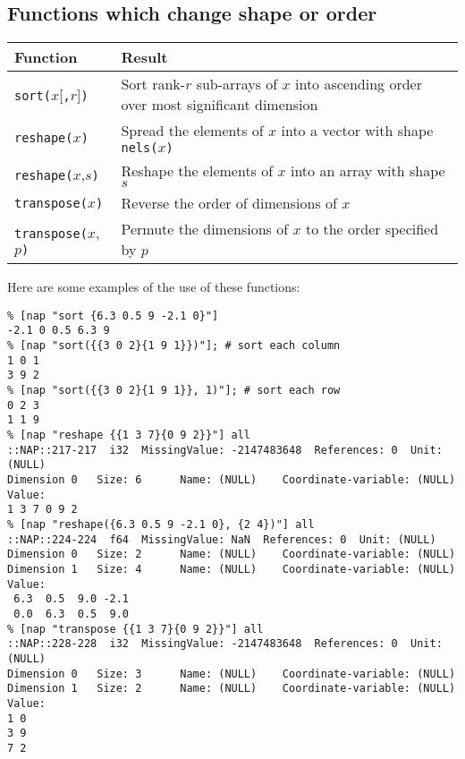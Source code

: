   \subsection{
    \label{change-shape-or-order}Functions which change shape or order
  }

\begin{tabular}{|l|l|}
    \hline 
      \textbf{Function} & \textbf{Result}
    \\
      \hline 
      \hline 
        \texttt{sort(}$x$[\texttt{,}$r$]\texttt{)} & Sort rank-$r$ sub-arrays of $x$ into ascending order over most significant dimension
      \\
      \hline 
        \texttt{reshape(}$x$\texttt{)} & Spread the elements of $x$ into a vector with shape \texttt{nels(}$x$\texttt{)}
      \\
      \hline 
        \texttt{reshape(}$x$,$s$\texttt{)} & Reshape the elements of $x$ into an array with shape $s$
      \\
      \hline 
        \texttt{transpose(}$x$\texttt{)} & Reverse the order of dimensions of $x$
      \\
      \hline 
        \texttt{transpose(}$x$,$p$\texttt{)} & Permute the dimensions of $x$ to the order specified by $p$
      \\
  \hline
\end{tabular}

  \par Here are some examples of the use of these functions:
  \begin{verbatim}
% [nap "sort {6.3 0.5 9 -2.1 0}"]
-2.1 0 0.5 6.3 9
% [nap "sort({{3 0 2}{1 9 1}})"]; # sort each column
1 0 1
3 9 2
% [nap "sort({{3 0 2}{1 9 1}}, 1)"]; # sort each row
0 2 3
1 1 9
% [nap "reshape {{1 3 7}{0 9 2}}"] all
::NAP::217-217  i32  MissingValue: -2147483648  References: 0  Unit:
(NULL)
Dimension 0   Size: 6      Name: (NULL)    Coordinate-variable: (NULL)
Value:
1 3 7 0 9 2
% [nap "reshape({6.3 0.5 9 -2.1 0}, {2 4})"] all
::NAP::224-224  f64  MissingValue: NaN  References: 0  Unit: (NULL)
Dimension 0   Size: 2      Name: (NULL)    Coordinate-variable: (NULL)
Dimension 1   Size: 4      Name: (NULL)    Coordinate-variable: (NULL)
Value:
 6.3  0.5  9.0 -2.1
 0.0  6.3  0.5  9.0
% [nap "transpose {{1 3 7}{0 9 2}}"] all
::NAP::228-228  i32  MissingValue: -2147483648  References: 0  Unit:
(NULL)
Dimension 0   Size: 3      Name: (NULL)    Coordinate-variable: (NULL)
Dimension 1   Size: 2      Name: (NULL)    Coordinate-variable: (NULL)
Value:
1 0
3 9
7 2
\end{verbatim}

